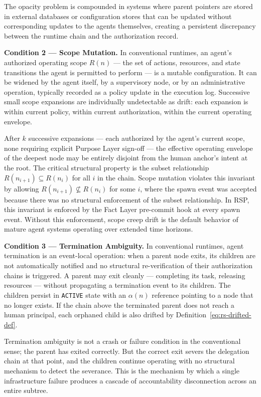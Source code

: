 The opacity problem is compounded in systems where parent pointers are stored in external databases or configuration stores that can be updated without corresponding updates to the agents themselves, creating a persistent discrepancy between the runtime chain and the authorization record.

\medskip
\noindent\textbf{Condition 2 — Scope Mutation.}
In conventional runtimes, an agent's authorized operating scope $R(n)$ — the set of actions, resources, and state transitions the agent is permitted to perform — is a mutable configuration. It can be widened by the agent itself, by a supervisory node, or by an administrative operation, typically recorded as a policy update in the execution log. Successive small scope expansions are individually undetectable as drift: each expansion is within current policy, within current authorization, within the current operating envelope.

After $k$ successive expansions — each authorized by the agent's current scope, none requiring explicit Purpose Layer sign-off — the effective operating envelope of the deepest node may be entirely disjoint from the human anchor's intent at the root. The critical structural property is the subset relationship $R(n_{i+1}) \subseteq R(n_i)$ for all $i$ in the chain. Scope mutation violates this invariant by allowing $R(n_{i+1}) \not\subseteq R(n_i)$ for some $i$, where the spawn event was accepted because there was no structural enforcement of the subset relationship. In RSP, this invariant is enforced by the Fact Layer pre-commit hook at every spawn event. Without this enforcement, scope creep drift is the default behavior of mature agent systems operating over extended time horizons.

\medskip
\noindent\textbf{Condition 3 — Termination Ambiguity.}
In conventional runtimes, agent termination is an event-local operation: when a parent node exits, its children are not automatically notified and no structural re-verification of their authorization chains is triggered. A parent may exit cleanly — completing its task, releasing resources — without propagating a termination event to its children. The children persist in \texttt{ACTIVE} state with an $\alpha(n)$ reference pointing to a node that no longer exists. If the chain above the terminated parent does not reach a human principal, each orphaned child is also drifted by Definition~\ref{eq:rs-drifted-def}.

Termination ambiguity is not a crash or failure condition in the conventional sense; the parent has exited correctly. But the correct exit severs the delegation chain at that point, and the children continue operating with no structural mechanism to detect the severance. This is the mechanism by which a single infrastructure failure produces a cascade of accountability disconnection across an entire subtree.

